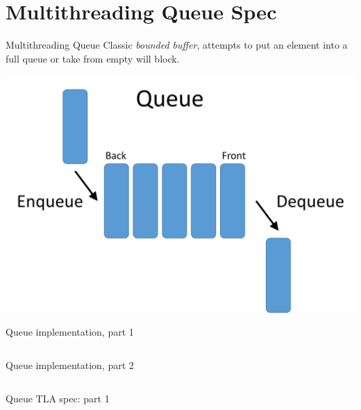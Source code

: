 \documentclass[12pt]{beamer}
\begin{document}
  \section{Multithreading Queue Spec}
  \begin{frame}{Multithreading Queue}
      Classic \textit{bounded buffer}, attempts to put an element into a
      full queue or take from empty will block.
      \begin{center}
          \includegraphics[scale=0.30]{figures/queue}
      \end{center}
  \end{frame}
  \begin{frame}{Queue implementation, part 1}
      \begin{center}
          \inputminted[firstline=1,lastline=20,linenos,
            fontsize=\scriptsize]{python}{figures/queue.py}
      \end{center}
  \end{frame}
  \begin{frame}{Queue implementation, part 2}
      \begin{center}
          \inputminted[firstline=22,lastline=40,linenos,
            fontsize=\scriptsize]{python}{figures/queue.py}
      \end{center}
  \end{frame}
  \begin{frame}{Queue TLA spec: part 1}
      \begin{center}
          \inputminted[firstline=1,lastline=16,linenos,
            fontsize=\scriptsize]{tla}{figures/buffer.tla}
      \end{center}
  \end{frame}
\end{document}
